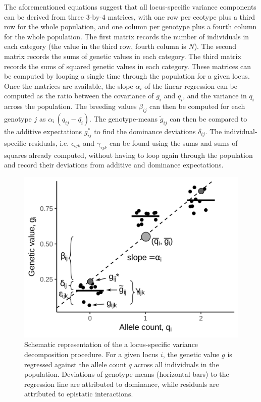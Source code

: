 \documentclass[]{article}
\begin{document}
The aforementioned equations suggest that all locus-specific variance components can be derived from three 3-by-4 matrices, with one row per ecotype plus a third row for the whole population, and one column per genotype plus a fourth column for the whole population. The first matrix records the number of individuals in each category (the value in the third row, fourth column is $N$). The second matrix records the sums of genetic values in each category. The third matrix records the sums of squared genetic values in each category. These matrices can be computed by looping a single time through the population for a given locus. Once the matrices are available, the slope $\alpha_i$ of the linear regression can be computed as the ratio between the covariance of $g_i$ and $q_i$, and the variance in $q_i$ across the population. The breeding values $\beta_{ij}$ can then be computed for each genotype $j$ as $\alpha_i \, (q_{ij} - \bar{q_i})$. The genotype-means $\tilde{g}_{ij}$ can then be compared to the additive expectations $g^*_{ij}$ to find the dominance deviations $\delta_{ij}$. The individual-specific residuals, i.e. $\epsilon_{ijk}$ and $\gamma_{ijk}$ can be found using the sums and sums of squares already computed, without having to loop again through the population and record their deviations from additive and dominance expectations.

\begin{figure}
	\includegraphics{variance-decomp-custom.png}
	\caption{Schematic representation of the a locus-specific variance decomposition procedure. For a given locus $i$, the genetic value $g$ is regressed against the allele count $q$ across all individuals in the population. Deviations of genotype-means (horizontal bars) to the regression line are attributed to dominance, while residuals are attributed to epistatic interactions.}
	\label{fig:regression}
\end{figure}
\end{document}
